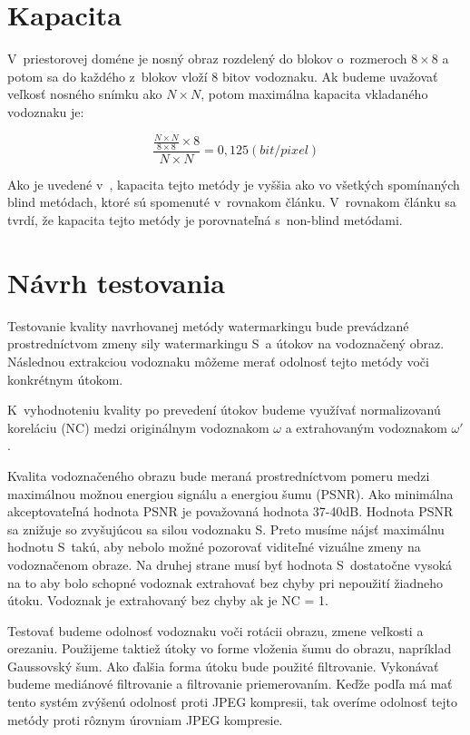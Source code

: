 \clearpage
\section{Kapacita}
V~priestorovej doméne je nosný obraz rozdelený do blokov o~rozmeroch $8\times8$ a potom sa do každého z~blokov vloží 8 bitov vodoznaku. Ak budeme uvažovať veľkosť nosného snímku ako $N\times N$, potom maximálna kapacita vkladaného vodoznaku je:

\begin{equation}
\frac{\frac{N\times N}{8\times 8}\times 8}{N \times N} =  0,125(bit/pixel)
\end{equation}

Ako je uvedené v~\cite{QRdecomposition}, kapacita tejto metódy je vyššia ako vo všetkých spomínaných blind metódach, ktoré sú spomenuté v~rovnakom článku. V~rovnakom článku sa tvrdí, že kapacita tejto metódy je porovnateľná s~non-blind metódami.

\section{Návrh testovania}
Testovanie kvality navrhovanej metódy watermarkingu bude prevádzané prostredníctvom zmeny sily watermarkingu S~a útokov na vodoznačený obraz. Následnou extrakciou vodoznaku môžeme merať odolnosť tejto metódy voči konkrétnym útokom.

K~vyhodnoteniu kvality po prevedení útokov budeme využívať normalizovanú koreláciu (NC) medzi originálnym vodoznakom $\omega$ a extrahovaným vodoznakom $\omega'$.

Kvalita vodoznačeného obrazu bude meraná prostredníctvom pomeru medzi maximálnou možnou energiou signálu a energiou šumu (PSNR). Ako minimálna akceptovateľná hodnota PSNR je považovaná hodnota 37-40dB. Hodnota PSNR sa znižuje so zvyšujúcou sa silou vodoznaku S. Preto musíme nájsť maximálnu hodnotu S~takú, aby nebolo možné pozorovať viditeľné vizuálne zmeny na vodoznačenom obraze. Na druhej strane musí byť hodnota S~dostatočne vysoká na to aby bolo schopné vodoznak extrahovať bez chyby pri nepoužití žiadneho útoku. Vodoznak je extrahovaný bez chyby ak je NC = 1.

Testovať budeme odolnosť vodoznaku voči rotácii obrazu, zmene veľkosti a orezaniu. Použijeme taktiež útoky vo forme vloženia šumu do obrazu, napríklad Gaussovský šum. Ako ďalšia forma útoku bude použité filtrovanie. Vykonávať budeme mediánové filtrovanie a filtrovanie priemerovaním. Keďže podľa \cite{QRdecomposition} má mať tento systém zvýšenú odolnosť proti JPEG kompresii, tak overíme odolnosť tejto metódy proti rôznym úrovniam JPEG kompresie.


